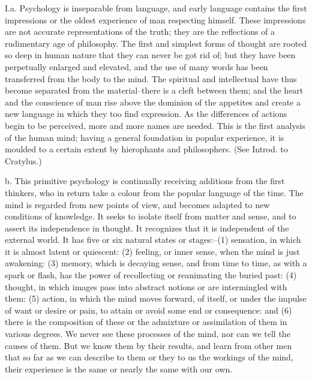 I.a. Psychology is inseparable from language, and early language
contains the first impressions or the oldest experience of man
respecting himself. These impressions are not accurate representations
of the truth; they are the reflections of a rudimentary age of
philosophy. The first and simplest forms of thought are rooted so deep
in human nature that they can never be got rid of; but they have been
perpetually enlarged and elevated, and the use of many words has been
transferred from the body to the mind. The spiritual and intellectual
have thus become separated from the material--there is a cleft between
them; and the heart and the conscience of man rise above the dominion
of the appetites and create a new language in which they too find
expression. As the differences of actions begin to be perceived, more
and more names are needed. This is the first analysis of the human mind;
having a general foundation in popular experience, it is moulded to
a certain extent by hierophants and philosophers. (See Introd. to
Cratylus.)

b. This primitive psychology is continually receiving additions from the
first thinkers, who in return take a colour from the popular language
of the time. The mind is regarded from new points of view, and becomes
adapted to new conditions of knowledge. It seeks to isolate itself
from matter and sense, and to assert its independence in thought. It
recognizes that it is independent of the external world. It has five
or six natural states or stages:--(1) sensation, in which it is almost
latent or quiescent: (2) feeling, or inner sense, when the mind is just
awakening: (3) memory, which is decaying sense, and from time to time,
as with a spark or flash, has the power of recollecting or reanimating
the buried past: (4) thought, in which images pass into abstract notions
or are intermingled with them: (5) action, in which the mind moves
forward, of itself, or under the impulse of want or desire or pain,
to attain or avoid some end or consequence: and (6) there is the
composition of these or the admixture or assimilation of them in various
degrees. We never see these processes of the mind, nor can we tell the
causes of them. But we know them by their results, and learn from other
men that so far as we can describe to them or they to us the workings of
the mind, their experience is the same or nearly the same with our own.

